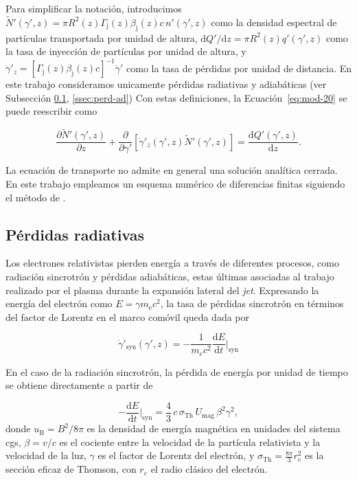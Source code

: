 	Para simplificar la notación, introducimos $\tilde{N}'(\gamma',z) = \pi R^2(z)\Gamma_\mathrm{j}(z)\beta_\mathrm{j}(z)c \, n'(\gamma',z)$ como la densidad espectral de partículas transportada por unidad de altura, $\mathrm{d}Q'/\mathrm{d}z=\pi R^2(z)q'(\gamma',z)$ como la tasa de inyección de partículas por unidad de altura, y $\dot{\gamma}'_z = [\Gamma_\mathrm{j}(z)\beta_\mathrm{j}(z)c]^{-1}\dot{\gamma}'$ como la tasa de pérdidas por unidad de distancia. En este trabajo consideramos unicamente p\'erdidas radiativas y adiab\'aticas (ver Subsecci\'on \ref{ssec:perd-rad}, \ref{ssec:perd-ad})
	Con estas definiciones, la Ecuación~\eqref{eq:mod-20} se puede reescribir como

\begin{equation}\label{eq:mod-21}
    \frac{\partial \tilde{N}'(\gamma',z)}{\partial z} 
+ \frac{\partial}{\partial \gamma'} \left[ \dot{\gamma}'_z(\gamma',z) \tilde{N}'(\gamma',z) \right]
= \frac{\mathrm{d}Q'(\gamma',z)}{\mathrm{d}z}.
\end{equation}

La ecuación de transporte no admite en general una solución analítica cerrada.
En este trabajo empleamos un esquema numérico de diferencias finitas siguiendo el método de \cite{Park1996}.

\subsection{Pérdidas radiativas}\label{ssec:perd-rad}

	Los electrones relativistas pierden energía a través de diferentes procesos, como radiación sincrotrón y pérdidas adiabáticas, estas \'ultimas asociadas al trabajo realizado por el plasma durante la expansión lateral del \textit{jet}.
	Expresando la energía del electrón como $E=\gamma m_\mathrm{e}c^2$, la tasa de pérdidas sincrotrón en términos del factor de Lorentz en el marco comóvil queda dada por
	
\begin{equation}\label{eq:dotgamma_syn}
	\dot{\gamma}'_{\mathrm{syn}}(\gamma',z) =-\frac{1}{m_e c^2}\frac{\mathrm{d}E}{\mathrm{d}t}\Bigg|_{\mathrm{syn}}
\end{equation}

	En el caso de la radiación sincrotrón, la p\'erdida de energía por unidad de tiempo se obtiene directamente a partir de \citep{Rybicki1979}

\begin{equation}\label{eq:mod-1}
    -\frac{\mathrm{d}E}{\mathrm{d}t}\Bigg|_{\mathrm{syn}} = \frac{4}{3}\,c\,\sigma_{\mathrm{Th}}\,U_{\mathrm{mag}}\,\beta^2 \gamma^2,
\end{equation}
donde $u_{\mathrm{B}} = B^2/8\pi$ es la densidad de energía magnética en unidades del sistema cgs, $\beta = v/c$ es el cociente entre la velocidad de la partícula relativista y la velocidad de la luz, $\gamma$ es el factor de Lorentz del electrón, y $\sigma_{\mathrm{Th}} = \tfrac{8\pi}{3} r_e^2$ es la sección eficaz de Thomson, con $r_e$ el radio clásico del electrón.  

